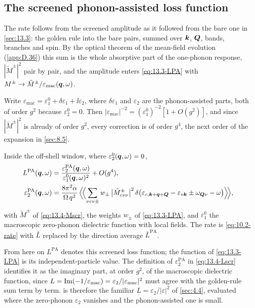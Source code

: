 \subsection{The screened phonon-assisted loss function}

The rate follows from the screened amplitude as it followed from the bare one in \cref{sec:13.3}: the golden rule into the bare pairs, summed over $\bm{k}$, $\bm{Q}$, bands, branches and spin. By the optical theorem of the mean-field evolution (\cref{app:D.36}) this sum is the whole absorptive part of the one-phonon response, $|\tilde M^\pm|^2$ pair by pair, and the amplitude enters \cref{eq:13.3-LPA} with $M^\pm \to \tilde M^\pm/\varepsilon_{\mathrm{mac}}(\bm{q},\omega)$.

Write $\varepsilon_{\mathrm{mac}} = \varepsilon_1^0 + \delta\varepsilon_1 + \ii\varepsilon_2$, where $\delta\varepsilon_1$ and $\varepsilon_2$ are the phonon-assisted parts, both of order $g^2$ because $\varepsilon_2^0 = 0$. Then $|\varepsilon_{\mathrm{mac}}|^{-2} = (\varepsilon_1^0)^{-2}[1 + O(g^2)]$, and since $|\tilde M^\pm|^2$ is already of order $g^2$, every correction is of order $g^4$, the next order of the expansion in \cref{sec:8.5}.
\begin{keyresult}
Inside the off-shell window, where $\varepsilon_2^0(\bm{q},\omega) = 0$,
\begin{equation}
  \begin{aligned}
  L^{\mathrm{PA}}(\bm{q},\omega) &= \frac{\varepsilon_2^{\mathrm{PA}}(\bm{q},\omega)}{\varepsilon_1^0(\bm{q},\omega)^2} + O(g^4) , \\
  \varepsilon_2^{\mathrm{PA}}(\bm{q},\omega) &= \frac{8\pi^2\alpha}{\Omega\,q^2}\,\Bigl\langle\!\Bigl\langle\sum_{\nu cv\pm}w_\pm\,\bigl|\tilde M^\pm_{cv\nu}\bigr|^2\,\delta\bigl(\varepsilon_{c,\bm{k}+\bm{q}+\bm{Q}} - \varepsilon_{v\bm{k}} \pm \omega_{\bm{Q}\nu} - \omega\bigr)\Bigr\rangle\!\Bigr\rangle ,
  \end{aligned}
  \label{eq:13.4-Lscr}
\end{equation}
with $\tilde M^\pm$ of \cref{eq:13.4-Mscr}, the weights $w_\pm$ of \cref{eq:13.3-LPA}, and $\varepsilon_1^0$ the macroscopic zero-phonon dielectric function with local fields. The rate is \cref{eq:10.2-rate} with $\bar L$ replaced by the direction average $\bar L^{\mathrm{PA}}$.
\end{keyresult}
\noindent From here on $L^{\mathrm{PA}}$ denotes this screened loss function; the function of \cref{eq:13.3-LPA} is its independent-particle value. The definition of $\varepsilon_2^{\mathrm{PA}}$ in \cref{eq:13.4-Lscr} identifies it as the imaginary part, at order $g^2$, of the macroscopic dielectric function, since $L = \operatorname{Im}(-1/\varepsilon_{\mathrm{mac}}) = \varepsilon_2/|\varepsilon_{\mathrm{mac}}|^2$ must agree with the golden-rule sum term by term.  is therefore the familiar $L = \varepsilon_2/|\varepsilon|^2$ of \cref{sec:4.4}, evaluated where the zero-phonon $\varepsilon_2$ vanishes and the phonon-assisted one is small.

